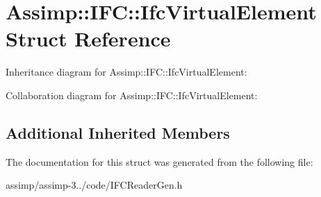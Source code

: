 \hypertarget{struct_assimp_1_1_i_f_c_1_1_ifc_virtual_element}{\section{Assimp\+:\+:I\+F\+C\+:\+:Ifc\+Virtual\+Element Struct Reference}
\label{struct_assimp_1_1_i_f_c_1_1_ifc_virtual_element}
}


Inheritance diagram for Assimp\+:\+:I\+F\+C\+:\+:Ifc\+Virtual\+Element\+:


Collaboration diagram for Assimp\+:\+:I\+F\+C\+:\+:Ifc\+Virtual\+Element\+:
\subsection*{Additional Inherited Members}


The documentation for this struct was generated from the following file\+:\begin{DoxyCompactItemize}
\item 
assimp/assimp-\/3../code/I\+F\+C\+Reader\+Gen.\+h\end{DoxyCompactItemize}
